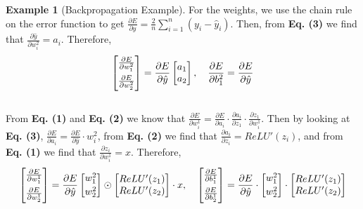 \documentclass[a4paper]{article}
\theoremstyle{definition}
\newtheorem{example}{Example}
\begin{document}
\begin{example}[Backpropagation Example]
    For the weights, we use the chain rule on the error function to get $\frac{\partial E}{\partial \hat{y}} = \frac{2}{n} \sum_{i=1}^{n} (y_i - \hat{y}_i)$.
    Then, from \textbf{Eq. (3)} we find that $\frac{\partial \hat{y}}{\partial w^2_i} = a_i$.
    Therefore,
    \begin{equation}
        \begin{bmatrix} \frac{\partial E}{\partial w^{2}_{1}} \vspace{4pt}\\ \frac{\partial E}{\partial w^{2}_{2}} \end{bmatrix} = \frac{\partial E}{\partial \hat{y}} \begin{bmatrix} a_1\\ a_2\end{bmatrix}, \quad \frac{\partial E}{\partial b^{2}_1} = \frac{\partial E}{\partial \hat{y}}
    \end{equation}
    \vspace{5pt}
    \\
    From \textbf{Eq. (1)} and \textbf{Eq. (2)} we know that $\frac{\partial E}{\partial w^1_i} = \frac{\partial E}{\partial a_i} \cdot \frac{\partial a_i}{\partial z_1} \cdot \frac{\partial z_1}{\partial w^1_i}$.
    Then by looking at \textbf{Eq. (3)}, $\frac{\partial E}{\partial a_i} = \frac{\partial E}{\partial \hat{y}} \cdot w^2_i$, from \textbf{Eq. (2)} we find that $\frac{\partial a_i}{\partial z_i} = ReLU'(z_i)$, and from \textbf{Eq. (1)} we find that $\frac{\partial z_i}{\partial w^1_i} = x$.
    Therefore,
    \begin{equation}
        \begin{bmatrix} \frac{\partial E}{\partial w^{1}_{1}} \vspace{4pt}\\ \frac{\partial E}{\partial w^{1}_{2}} \end{bmatrix} = \frac{\partial E}{\partial \hat{y}} \begin{bmatrix} w^2_1 \vspace{2pt}\\ w^2_2\end{bmatrix} \odot \begin{bmatrix} ReLU'(z_1)\\ ReLU'(z_2) \end{bmatrix} \cdot x,
        \quad \begin{bmatrix} \frac{\partial E}{\partial b^{1}_{1}} \vspace{4pt}\\ \frac{\partial E}{\partial b^{1}_{2}} \end{bmatrix} = \frac{\partial E}{\partial \hat{y}} \cdot \begin{bmatrix} w^2_1 \vspace{2pt}\\ w^2_2\end{bmatrix} \cdot \begin{bmatrix} ReLU'(z_1)\\ ReLU'(z_2) \end{bmatrix}

\end{equation}
\end{example}
\end{document}
